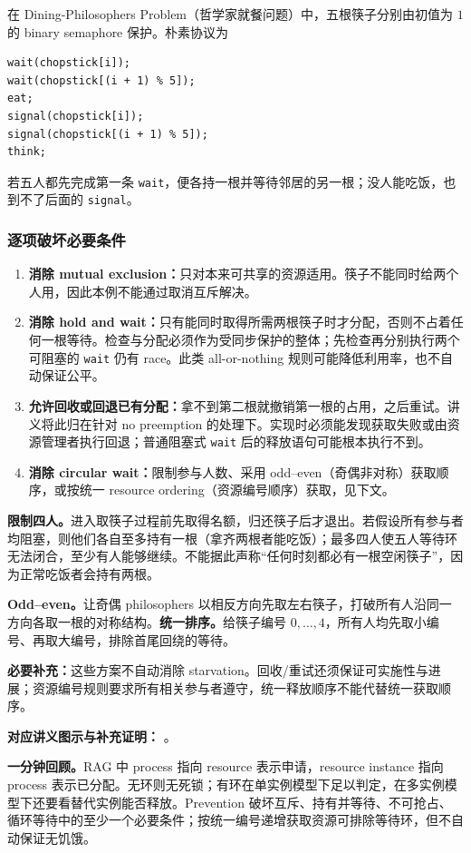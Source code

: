 在 Dining-Philosophers Problem（哲学家就餐问题）中，五根筷子分别由初值为 $1$ 的 binary semaphore 保护。朴素协议为
\begin{verbatim}
wait(chopstick[i]);
wait(chopstick[(i + 1) % 5]);
eat;
signal(chopstick[i]);
signal(chopstick[(i + 1) % 5]);
think;
\end{verbatim}
若五人都先完成第一条 \texttt{wait}，便各持一根并等待邻居的另一根；没人能吃饭，也到不了后面的 \texttt{signal}。

\subsubsection{逐项破坏必要条件}

\begin{enumerate}
  \item \textbf{消除 mutual exclusion：}只对本来可共享的资源适用。筷子不能同时给两个人用，因此本例不能通过取消互斥解决。
  \item \textbf{消除 hold and wait：}只有能同时取得所需两根筷子时才分配，否则不占着任何一根等待。检查与分配必须作为受同步保护的整体；先检查再分别执行两个可阻塞的 \texttt{wait} 仍有 race。此类 all-or-nothing 规则可能降低利用率，也不自动保证公平。
  \item \textbf{允许回收或回退已有分配：}拿不到第二根就撤销第一根的占用，之后重试。讲义将此归在针对 no preemption 的处理下。实现时必须能发现获取失败或由资源管理者执行回退；普通阻塞式 \texttt{wait} 后的释放语句可能根本执行不到。
  \item \textbf{消除 circular wait：}限制参与人数、采用 odd--even（奇偶非对称）获取顺序，或按统一 resource ordering（资源编号顺序）获取，见下文。
\end{enumerate}

\textbf{限制四人。}进入取筷子过程前先取得名额，归还筷子后才退出。若假设所有参与者均阻塞，则他们各自至多持有一根（拿齐两根者能吃饭）；最多四人使五人等待环无法闭合，至少有人能够继续。不能据此声称“任何时刻都必有一根空闲筷子”，因为正常吃饭者会持有两根。

\textbf{Odd--even。}让奇偶 philosophers 以相反方向先取左右筷子，打破所有人沿同一方向各取一根的对称结构。\textbf{统一排序。}给筷子编号 $0,\ldots,4$，所有人均先取小编号、再取大编号，排除首尾回绕的等待。

\textbf{必要补充：}这些方案不自动消除 starvation。回收/重试还须保证可实施性与进展；资源编号规则要求所有相关参与者遵守，统一释放顺序不能代替统一获取顺序。

\textbf{对应讲义图示与补充证明：}
。

\textbf{一分钟回顾。}RAG 中 process 指向 resource 表示申请，resource instance 指向 process 表示已分配。无环则无死锁；有环在单实例模型下足以判定，在多实例模型下还要看替代实例能否释放。Prevention 破坏互斥、持有并等待、不可抢占、循环等待中的至少一个必要条件；按统一编号递增获取资源可排除等待环，但不自动保证无饥饿。
